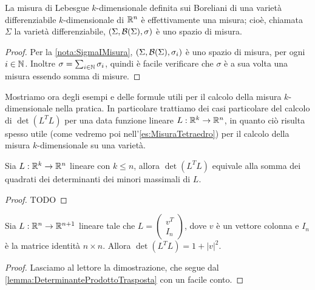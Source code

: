 \begin{theorem}
	La misura di Lebesgue $k$-dimensionale definita sui Boreliani di una varietà differenziabile $k$-dimensionale di $\mathbb R^n$ è effettivamente una misura; cioè, chiamata $\Sigma$ la varietà differenziabile, $(\Sigma,\mathcal B(\Sigma),\sigma)$ è uno spazio di misura.
\end{theorem}
\begin{proof}
	Per la \cref{nota:SigmaIMisura}, $(\Sigma,\mathcal B(\Sigma),\sigma_i)$ è uno spazio di misura, per ogni $i\in\mathbb N$. Inoltre $\sigma=\sum_{i\in\mathbb N}\sigma_i$, quindi è facile verificare che $\sigma$ è a sua volta una misura essendo somma di misure.
\end{proof}

Mostriamo ora degli esempi e delle formule utili per il calcolo della misura $k$-dimensionale nella pratica. In particolare trattiamo dei casi particolare del calcolo di $\det(L^TL)$ per una data funzione lineare $L:\mathbb R^k\to\mathbb R^n$, in quanto ciò risulta spesso utile (come vedremo poi nell'\cref{es:MisuraTetraedro}) per il calcolo della misura $k$-dimensionale su una varietà.

\begin{lemma}\label{lemma:DeterminanteProdottoTrasposta}
	Sia $L:\mathbb R^k\to\mathbb R^n$ lineare con $k\le n$, allora $\det(L^TL)$ equivale alla somma dei quadrati dei determinanti dei minori massimali di $L$.
\end{lemma}
\begin{proof}
	TODO
\end{proof}

\begin{remark}\label{nota:DeterminanteMatriceQuasiIdentita}
	Sia $L:\mathbb R^n\to\mathbb R^{n+1}$ lineare tale che $L=\begin{pmatrix} v^T \\ I_n \end{pmatrix}$, dove $v$ è un vettore colonna e $I_n$ è la matrice identità $n\times n$. Allora $\det(L^TL)=1+\lvert v \rvert ^2$.
\end{remark}
\begin{proof}
	Lasciamo al lettore la dimostrazione, che segue dal \cref{lemma:DeterminanteProdottoTrasposta} con un facile conto.
\end{proof}

